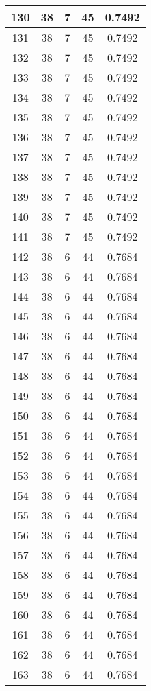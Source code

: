 \documentclass[letterpaper, 12pt]{article}
\begin{document}
\begin{longtable}{|c|c|c|c|c|}
\hline
130 & 38 & 7 & 45 & 0.7492 \\
\hline
131 & 38 & 7 & 45 & 0.7492 \\
\hline
132 & 38 & 7 & 45 & 0.7492 \\
\hline
133 & 38 & 7 & 45 & 0.7492 \\
\hline
134 & 38 & 7 & 45 & 0.7492 \\
\hline
135 & 38 & 7 & 45 & 0.7492 \\
\hline
136 & 38 & 7 & 45 & 0.7492 \\
\hline
137 & 38 & 7 & 45 & 0.7492 \\
\hline
138 & 38 & 7 & 45 & 0.7492 \\
\hline
139 & 38 & 7 & 45 & 0.7492 \\
\hline
140 & 38 & 7 & 45 & 0.7492 \\
\hline
141 & 38 & 7 & 45 & 0.7492 \\
\hline
142 & 38 & 6 & 44 & 0.7684 \\
\hline
143 & 38 & 6 & 44 & 0.7684 \\
\hline
144 & 38 & 6 & 44 & 0.7684 \\
\hline
145 & 38 & 6 & 44 & 0.7684 \\
\hline
146 & 38 & 6 & 44 & 0.7684 \\
\hline
147 & 38 & 6 & 44 & 0.7684 \\
\hline
148 & 38 & 6 & 44 & 0.7684 \\
\hline
149 & 38 & 6 & 44 & 0.7684 \\
\hline
150 & 38 & 6 & 44 & 0.7684 \\
\hline
151 & 38 & 6 & 44 & 0.7684 \\
\hline
152 & 38 & 6 & 44 & 0.7684 \\
\hline
153 & 38 & 6 & 44 & 0.7684 \\
\hline
154 & 38 & 6 & 44 & 0.7684 \\
\hline
155 & 38 & 6 & 44 & 0.7684 \\
\hline
156 & 38 & 6 & 44 & 0.7684 \\
\hline
157 & 38 & 6 & 44 & 0.7684 \\
\hline
158 & 38 & 6 & 44 & 0.7684 \\
\hline
159 & 38 & 6 & 44 & 0.7684 \\
\hline
160 & 38 & 6 & 44 & 0.7684 \\
\hline
161 & 38 & 6 & 44 & 0.7684 \\
\hline
162 & 38 & 6 & 44 & 0.7684 \\
\hline
163 & 38 & 6 & 44 & 0.7684 \\

\end{longtable}
\end{document}
